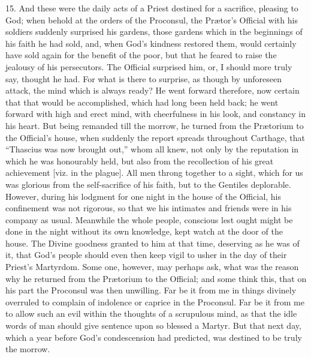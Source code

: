 15. And these were the daily
acts of a Priest destined for a sacrifice, pleasing to God; when
behold at the orders of the Proconsul, the Prætor's Official with his
soldiers suddenly surprised his gardens, those gardens which in the
beginnings of his faith he had sold, and, when God's kindness restored
them, would certainly have sold again for the benefit of the
poor, but that he feared to raise the jealousy of his persecutors. The
Official surprised him, or, I should more truly say, thought he had.
For what is there to surprise, as though by unforeseen attack, the
mind which is always ready? He went forward therefore, now certain
that that would be accomplished, which had long been held back; he
went forward with high and erect mind, with cheerfulness in his look,
and constancy in his heart. But being remanded till the morrow, he
turned from the Prætorium to the Official's house, when suddenly the
report spreads throughout Carthage, that ``Thascius was now brought
out,'' whom all knew, not only by the reputation in which he was
honourably held, but also from the recollection of his great
achievement [viz. in the plague]. All men throng together to a sight,
which for us was glorious from the self-sacrifice of his faith, but to
the Gentiles deplorable. However, during his lodgment for one night in
the house of the Official, his confinement was not rigorous, so that
we his intimates and friends were in his company as usual. Meanwhile
the whole people, conscious lest ought might be done in the night
without its own knowledge, kept watch at the door of the house. The
Divine goodness granted to him at that time, deserving as he was of
it, that God's people should even then keep vigil to usher in the day
of their Priest's Martyrdom. Some one, however, may perhaps ask, what
was the reason why he returned from the Prætorium to the Official;
and some think this, that on his part the Proconsul was then
unwilling. Far be it from me in things divinely overruled to complain
of indolence or caprice in the Proconsul. Far be it from me to allow
such an evil within the thoughts of a scrupulous mind, as that the
idle words of man should give sentence upon so blessed a Martyr. But
that next day, which a year before God's condescension had predicted,
was destined to be truly the morrow.

